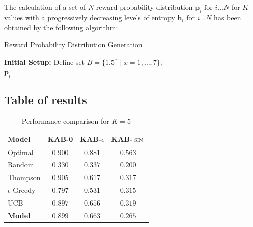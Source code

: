 \noindent The calculation of a set of $N$ reward probability distribution $\mathbf{p}_{i}\text{  for  } i\ldots N$ for $K$ values with a progressively decreasing levels of entropy $\mathbf{h}_{i}\text{  for  } i\ldots N$ has been obtained by the following algorithm:

\begin{algorithm}[ht]
\caption{Reward Probability Distribution Generation}
\label{alg:reward_distribution}
\SetAlgoLined
{}
\textbf{Initial Setup:}
Define set $B = \{1.5^x \mid x = 1, \ldots, 7\}$; \\
\Return ${\mathbf{p}_i}$
\end{algorithm}


\subsection{Table of results}

\begin{table}[H]
\centering
\caption{Performance comparison for $K=5$}
\label{tab:k5}
\begin{tabular}{l c c c}
\toprule
\textbf{Model} & \textbf{\textsc{KAB-0}} & \textbf{\textsc{KAB-$\epsilon$}} & \textbf{\textsc{KAB-$\sin$}}\\
\midrule
Optimal & $0.900$ & $0.881$ & $0.563$ \\
Random & $0.330$ & $0.337$ & $0.200$ \\
\midrule
Thompson & $0.905$ & $0.617$ & $0.317$ \\
$\epsilon$-Greedy & $0.797$ & $0.531$ & $0.315$ \\
UCB & $0.897$ & $0.656$ & $0.319$ \\
\textbf{Model} & $\mathbf{0.899}$ & $\mathbf{0.663}$ & $\mathbf{0.265}$ \\

\bottomrule
\end{tabular}
\end{table}


